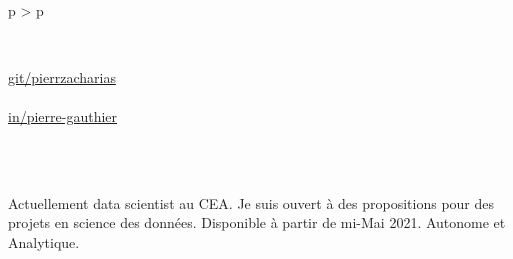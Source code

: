 \documentclass[cv]{cv_style}
\begin{document}
{
\vspace{0.0cm}\\
\begin{tabular}{p{\leftsize\textwidth} > {\arraybackslash}p{\rightsize\textwidth}}
    \textsize
    \begin{minipage}[t]{\leftsize\textwidth}


        \small
        \vspace{-0.85cm}
						\vspace{-0.50cm}\\
            \begin{flushright}
            \hfill \githubSymbol \hspace{0.5em} \href{http://www.github.com/pierrzacharias}{git/pierrzacharias} \\
						\vspace{.1cm}\\
            \hfill \linkedinSymbol \hspace{0.5em} \href{https://www.linkedin.com/in/pierre-zacharias-gauthier-293750133/}{in/pierre-gauthier} \\
            \end{flushright}

        \vspace{0.5cm}\\

        \vspace{-0.50cm}\\
        \begin{justify}   
					Actuellement data scientist au CEA. Je suis ouvert à des propositions pour des projets en science des données. Disponible à partir de mi-Mai 2021. Autonome et Analytique.  \\
        \end{justify}


\end{minipage}
\end{tabular}}
\end{document}
